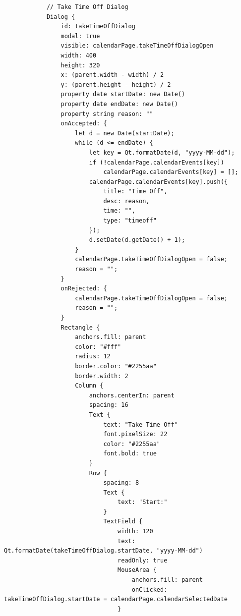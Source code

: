 \documentclass{report}
\begin{document}
\begin{lstlisting}
            // Take Time Off Dialog
            Dialog {
                id: takeTimeOffDialog
                modal: true
                visible: calendarPage.takeTimeOffDialogOpen
                width: 400
                height: 320
                x: (parent.width - width) / 2
                y: (parent.height - height) / 2
                property date startDate: new Date()
                property date endDate: new Date()
                property string reason: ""
                onAccepted: {
                    let d = new Date(startDate);
                    while (d <= endDate) {
                        let key = Qt.formatDate(d, "yyyy-MM-dd");
                        if (!calendarPage.calendarEvents[key])
                            calendarPage.calendarEvents[key] = [];
                        calendarPage.calendarEvents[key].push({
                            title: "Time Off",
                            desc: reason,
                            time: "",
                            type: "timeoff"
                        });
                        d.setDate(d.getDate() + 1);
                    }
                    calendarPage.takeTimeOffDialogOpen = false;
                    reason = "";
                }
                onRejected: {
                    calendarPage.takeTimeOffDialogOpen = false;
                    reason = "";
                }
                Rectangle {
                    anchors.fill: parent
                    color: "#fff"
                    radius: 12
                    border.color: "#2255aa"
                    border.width: 2
                    Column {
                        anchors.centerIn: parent
                        spacing: 16
                        Text {
                            text: "Take Time Off"
                            font.pixelSize: 22
                            color: "#2255aa"
                            font.bold: true
                        }
                        Row {
                            spacing: 8
                            Text {
                                text: "Start:"
                            }
                            TextField {
                                width: 120
                                text: Qt.formatDate(takeTimeOffDialog.startDate, "yyyy-MM-dd")
                                readOnly: true
                                MouseArea {
                                    anchors.fill: parent
                                    onClicked: takeTimeOffDialog.startDate = calendarPage.calendarSelectedDate
                                }

\end{lstlisting}
\end{document}
